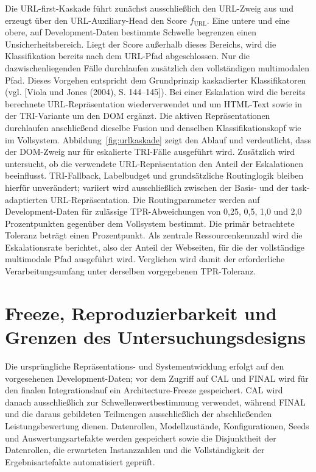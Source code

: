 Die URL-first-Kaskade führt zunächst ausschließlich den URL-Zweig aus und erzeugt über den
URL-Auxiliary-Head den Score $f_{\mathrm{URL}}$. Eine untere und eine obere, auf
Development-Daten bestimmte Schwelle begrenzen einen Unsicherheitsbereich. Liegt der Score
außerhalb dieses Bereichs, wird die Klassifikation bereits nach dem URL-Pfad abgeschlossen.
Nur die dazwischenliegenden Fälle durchlaufen zusätzlich den vollständigen multimodalen Pfad.
Dieses Vorgehen entspricht dem Grundprinzip kaskadierter Klassifikatoren
(vgl. [Viola und Jones (2004), S. 144--145]). Bei einer Eskalation wird die bereits berechnete URL-Repräsentation wiederverwendet und um
HTML-Text sowie in der TRI-Variante um den DOM ergänzt. Die aktiven Repräsentationen
durchlaufen anschließend dieselbe Fusion und denselben Klassifikationskopf wie im Vollsystem.
Abbildung~\ref{fig:urlkaskade} zeigt den Ablauf und verdeutlicht, dass der DOM-Zweig nur für
eskalierte TRI-Fälle ausgeführt wird. Zusätzlich wird untersucht, ob die verwendete URL-Repräsentation den Anteil der Eskalationen
beeinflusst. TRI-Fallback, Labelbudget und grundsätzliche Routinglogik bleiben hierfür
unverändert; variiert wird ausschließlich zwischen der Basis- und der task-adaptierten
URL-Repräsentation. Die Routingparameter werden auf Development-Daten für zulässige
TPR-Abweichungen von 0,25, 0,5, 1,0 und 2,0 Prozentpunkten gegenüber dem Vollsystem
bestimmt. Die primär betrachtete Toleranz beträgt einen Prozentpunkt. Als zentrale
Ressourcenkennzahl wird die Eskalationsrate berichtet, also der Anteil der Webseiten, für die
der vollständige multimodale Pfad ausgeführt wird. Verglichen wird damit der erforderliche
Verarbeitungsumfang unter derselben vorgegebenen TPR-Toleranz.

\section{Freeze, Reproduzierbarkeit und Grenzen des Untersuchungsdesigns}

Die ursprüngliche Repräsentations- und Systementwicklung erfolgt auf den vorgesehenen
Development-Daten; vor dem Zugriff auf CAL und FINAL wird für den finalen Integrationslauf
ein Architecture-Freeze gespeichert. CAL wird danach ausschließlich zur Schwellenwertbestimmung
verwendet, während FINAL und die daraus gebildeten Teilmengen ausschließlich der abschließenden
Leistungsbewertung dienen. Datenrollen, Modellzustände, Konfigurationen, Seeds und
Auswertungsartefakte werden gespeichert sowie die Disjunktheit der Datenrollen, die erwarteten
Instanzzahlen und die Vollständigkeit der Ergebnisartefakte automatisiert geprüft.

